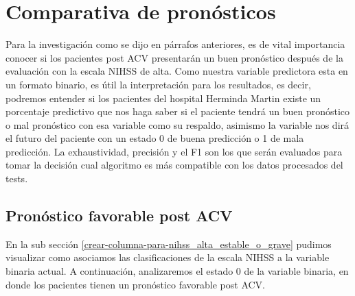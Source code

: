     \hypertarget{comparativa-de-pronuxf3sticos}{%
\section{Comparativa de pronósticos}\label{comparativa-de-pronuxf3sticos}}

	Para la investigación como se dijo en párrafos anteriores, es de vital importancia conocer si los pacientes post ACV presentarán un buen pronóstico después de la evaluación con la escala NIHSS de alta. Como nuestra variable predictora esta en un formato binario, es útil la interpretación para los resultados, es decir, podremos entender si los pacientes del hospital Herminda Martin existe un porcentaje predictivo que nos haga saber si el paciente tendrá un buen pronóstico o mal pronóstico con esa variable como su respaldo, asimismo la variable nos dirá el futuro del paciente con un estado 0 de buena predicción o 1 de mala predicción.
	La exhaustividad, precisión y el F1 son los que serán evaluados para tomar la decisión cual algoritmo es más compatible con los datos
procesados del tests.

    \hypertarget{pronuxf3stico-favorable-post-acv}{%
\subsection{Pronóstico favorable post ACV}\label{pronuxf3stico-favorable-post-acv}}

	En la sub sección \ref{crear-columna-para-nihss_alta_estable_o_grave} pudimos visualizar como asociamos las clasificaciones de la escala NIHSS a la variable binaria actual. A continuación, analizaremos el estado 0 de la variable binaria, en donde los pacientes tienen un pronóstico favorable post ACV.

